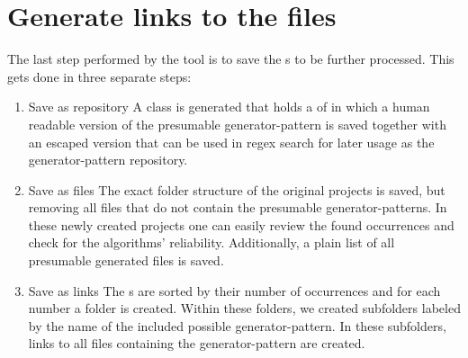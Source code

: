 \section{Generate links to the files}
\label{section:generateLinks}
The last step performed by the tool is to save the s to be further processed. This gets done in three separate steps:
\begin{enumerate}
	\item Save as repository
		\subitem A  class is generated that holds a  of  in which a human readable version of the presumable generator-pattern is saved together with an escaped version that can be used in regex search for later usage as the generator-pattern repository.
	\item Save as files
		\subitem The exact folder structure of the original projects is saved, but removing all files that do not contain the presumable generator-patterns. In these newly created projects one can easily review the found occurrences and check for the algorithms' reliability. Additionally, a plain  list of all presumable generated files is saved.
	\item Save as links
		\subitem The s are sorted by their number of occurrences and for each number a folder is created. Within these folders, we created subfolders labeled by the name of the included possible generator-pattern. In these subfolders, links to all files containing the generator-pattern are created.
\end{enumerate} 

\cleardoublepage{}
